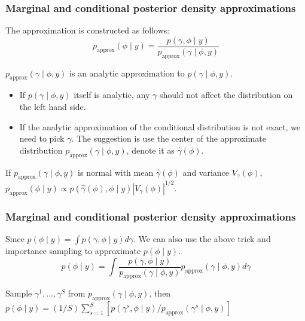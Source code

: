 \documentclass{beamer}
\begin{document}
\begin{frame}
  \frametitle{Marginal and conditional posterior density
    approximations}
The approximation is constructed as follows:
\[
p_{\text{approx}}(\phi \mid y) = \frac{p(\gamma, \phi \mid
  y)}{p_{\text{approx}}(\gamma \mid \phi, y)}
\]

$p_{\text{approx}}(\gamma \mid \phi, y)$ is an analytic approximation
to $p(\gamma \mid \phi, y)$.

\begin{itemize}
\item If $p(\gamma \mid \phi, y)$ itself is analytic, any $\gamma$
  should not affect the distribution on the left hand side.
\item If the analytic approximation of the conditional distribution is
  not exact, we need to pick $\gamma$. The suggestion is use the
  center of the approximate distribution $p_{\text{approx}}(\gamma
  \mid \phi, y)$, denote it as $\hat{\gamma}(\phi)$.
\end{itemize}
If $p_{\text{approx}}(\gamma \mid \phi, y)$ is normal with mean
$\hat{\gamma}(\phi)$ and variance $V_\gamma(\phi)$,
$p_{\text{approx}}(\phi \mid y) \propto p(\hat{\gamma}(\phi), \phi
\mid y) |V_\gamma(\phi)|^{1/2}$.
\end{frame}


\begin{frame}
  \frametitle{Marginal and conditional posterior density
    approximations}
Since $p(\phi \mid y) = \int p(\gamma, \phi \mid y) d\gamma$. We can also use the above trick and importance sampling to
approximate $p(\phi \mid y)$.
\[
p(\phi \mid y) = \int \frac{p(\gamma, \phi \mid y)}{p_{\text{approx}}(\gamma
  \mid \phi, y)} p_{\text{approx}}(\gamma
  \mid \phi, y) d\gamma 
\]

Sample $\gamma^1, \ldots, \gamma^S$ from $p_{\text{approx}}(\gamma
  \mid \phi, y)$, then $p(\phi \mid y) = (1/ S) \sum_{s=1}^S [p(\gamma^s, \phi \mid y)/p_{\text{approx}}(\gamma^s
  \mid \phi, y)]$
\end{frame}
\end{document}

